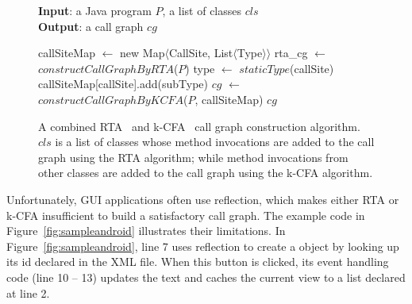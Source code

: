 \begin{figure}[t]
\textbf{Input}: a Java program $P$, a list of classes $cls$\\
\textbf{Output}: a call graph $cg$\\
\vspace{-5mm}
\begin{algorithmic}[1]
\STATE callSiteMap $\leftarrow$ new Map$\langle$CallSite, List$\langle$Type$\rangle$$\rangle$
\STATE rta\_cg $\leftarrow$ $constructCallGraphByRTA$($P$)
\STATE type $\leftarrow$ $staticType$(callSite)
\STATE callSiteMap[callSite].add(subType)
\ENDIF
\ENDFOR
\ENDIF
\ENDFOR
\ENDFOR
\STATE $cg$ $\leftarrow$ $constructCallGraphByKCFA$($P$, callSiteMap)
\RETURN $cg$
\vspace{-2mm}
\end{algorithmic}
\label{fig:cgalgorithm}
\caption{A combined  RTA~\cite{rta} and k-CFA~\cite{kcfa} call graph construction algorithm.
$cls$ is a list of classes whose method invocations are added to the
call graph using the RTA algorithm; while method invocations from other classes
are added to the call graph using the k-CFA algorithm.
} 
\end{figure}


Unfortunately, GUI applications often use reflection, which makes either
RTA or k-CFA insufficient to build a satisfactory call graph. 
The example code in Figure~\ref{fig:sampleandroid}  illustrates their limitations.
In Figure~\ref{fig:sampleandroid}, line 7 uses reflection to create a 
object by looking up its id declared in the XML file. When this button
is clicked, its event handling code (line 10 -- 13) updates the text and caches
the current view to a list declared at line 2.

